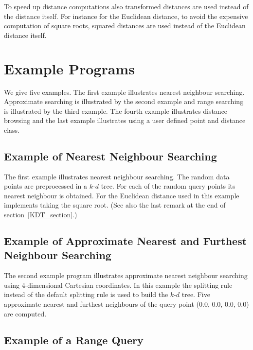To speed up distance computations also transformed
distances are used instead of the distance itself. 
For instance for the Euclidean distance, to avoid the expensive computation
of square roots, squared distances are used instead of the Euclidean distance itself. 

\section{Example Programs}

We give five examples. 
The first example illustrates nearest neighbour searching.
Approximate searching is illustrated by the second example and range
searching is illustrated by the third example.
The fourth example illustrates distance browsing and the last example illustrates using
a user defined point and distance class.

\subsection{Example of Nearest Neighbour Searching}

The first example illustrates nearest neighbour searching. The random data points are preprocessed
in a $k$-$d$ tree. For each of the random query points its nearest neighbour is obtained.
For the Euclidean distance used in this example 
implements taking the square root. (See also the last remark at the end of section~\ref{KDT_section}.)



\subsection{Example of Approximate Nearest and Furthest Neighbour Searching}

The second example program illustrates approximate nearest neighbour searching
using 4-dimensional Cartesian coordinates.
In this example the  splitting rule instead of the default splitting
rule is used to build the $k$-$d$ tree. Five approximate nearest and furthest neighbours of
the query point (0.0, 0.0, 0.0, 0.0) are computed.
 

\subsection{Example of a Range Query}

